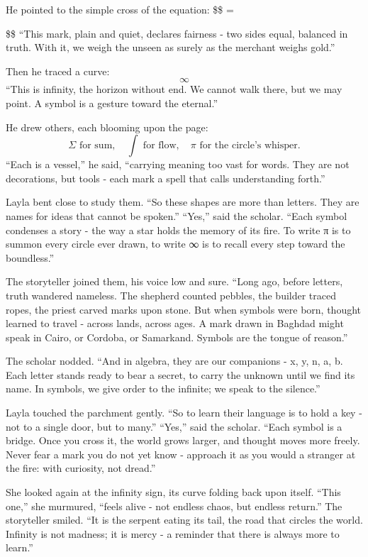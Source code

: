 \documentclass[
  letterpaper,
  DIV=11,
  numbers=noendperiod]{scrreprt}
\begin{document}
He pointed to the simple cross of the equation: \$\$ =

\$\$ ``This mark, plain and quiet, declares fairness - two sides equal,
balanced in truth. With it, we weigh the unseen as surely as the
merchant weighs gold.''

Then he traced a curve: \[
\infty
\] ``This is infinity, the horizon without end. We cannot walk there,
but we may point. A symbol is a gesture toward the eternal.''

He drew others, each blooming upon the page: \[
\Sigma \text{ for sum}, \quad \int \text{ for flow}, \quad \pi \text{ for the circle's whisper.}
\] ``Each is a vessel,'' he said, ``carrying meaning too vast for words.
They are not decorations, but tools - each mark a spell that calls
understanding forth.''

Layla bent close to study them. ``So these shapes are more than letters.
They are names for ideas that cannot be spoken.'' ``Yes,'' said the
scholar. ``Each symbol condenses a story - the way a star holds the
memory of its fire. To write π is to summon every circle ever drawn, to
write ∞ is to recall every step toward the boundless.''

The storyteller joined them, his voice low and sure. ``Long ago, before
letters, truth wandered nameless. The shepherd counted pebbles, the
builder traced ropes, the priest carved marks upon stone. But when
symbols were born, thought learned to travel - across lands, across
ages. A mark drawn in Baghdad might speak in Cairo, or Cordoba, or
Samarkand. Symbols are the tongue of reason.''

The scholar nodded. ``And in algebra, they are our companions - x, y, n,
a, b. Each letter stands ready to bear a secret, to carry the unknown
until we find its name. In symbols, we give order to the infinite; we
speak to the silence.''

Layla touched the parchment gently. ``So to learn their language is to
hold a key - not to a single door, but to many.'' ``Yes,'' said the
scholar. ``Each symbol is a bridge. Once you cross it, the world grows
larger, and thought moves more freely. Never fear a mark you do not yet
know - approach it as you would a stranger at the fire: with curiosity,
not dread.''

She looked again at the infinity sign, its curve folding back upon
itself. ``This one,'' she murmured, ``feels alive - not endless chaos,
but endless return.'' The storyteller smiled. ``It is the serpent eating
its tail, the road that circles the world. Infinity is not madness; it
is mercy - a reminder that there is always more to learn.''
\end{document}
